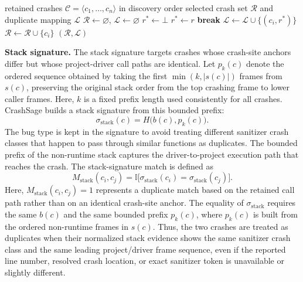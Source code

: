 \documentclass[pdflatex,sn-basic]{sn-jnl}%
\theoremstyle{thmstyleone}%
\theoremstyle{thmstyletwo}%
\theoremstyle{thmstylethree}%
\begin{document}
\begin{algorithm}[H]
\caption{Representative Selection}
\label{alg:representative-selection}
\begin{algorithmic}
\Require retained crashes \(\mathcal{C}=\langle c_1,\ldots,c_n\rangle\) in discovery order
\Ensure selected crash set \(\mathcal{R}\) and duplicate mapping \(\mathcal{L}\)
\State \(\mathcal{R}\gets\varnothing\), \(\mathcal{L}\gets\varnothing\)
    \State \(r^\ast\gets\bot\)
            \State \(r^\ast\gets r\)
            \State \textbf{break}
        \EndIf
    \EndFor
        \State \(\mathcal{L}\gets\mathcal{L}\cup\{(c_i,r^\ast)\}\)
    \Else
        \State \(\mathcal{R}\gets\mathcal{R}\cup\{c_i\}\)
    \EndIf
\EndFor
\State \Return \((\mathcal{R},\mathcal{L})\)
\end{algorithmic}
\end{algorithm}

\textbf{Stack signature.} The stack signature targets crashes whose crash-site anchors differ but whose project-driver call paths are identical.
Let \(p_k(c)\) denote the ordered sequence obtained by taking the first \(\min(k,|s(c)|)\) frames from \(s(c)\), preserving the original stack order from the top crashing frame to lower caller frames.
Here, \(k\) is a fixed prefix length used consistently for all crashes.
CrashSage builds a stack signature from this bounded prefix:
\begin{equation*}
\sigma_{\mathrm{stack}}(c)=H\bigl(b(c),p_k(c)\bigr).
\end{equation*}
The bug type is kept in the signature to avoid treating different sanitizer crash classes that happen to pass through similar functions as duplicates.
The bounded prefix of the non-runtime stack captures the driver-to-project execution path that reaches the crash.
The stack-signature match is defined as
\begin{equation*}
M_{\mathrm{stack}}(c_i,c_j)=
\mathbb{I}\bigl[
\sigma_{\mathrm{stack}}(c_i)=\sigma_{\mathrm{stack}}(c_j)
\bigr].
\end{equation*}
Here, \(M_{\mathrm{stack}}(c_i,c_j)=1\) represents a duplicate match based on the retained call path rather than on an identical crash-site anchor.
The equality of \(\sigma_{\mathrm{stack}}\) requires the same \(b(c)\) and the same bounded prefix \(p_k(c)\), where \(p_k(c)\) is built from the ordered non-runtime frames in \(s(c)\).
Thus, the two crashes are treated as duplicates when their normalized stack evidence shows the same sanitizer crash class and the same leading project/driver frame sequence, even if the reported line number, resolved crash location, or exact sanitizer token is unavailable or slightly different.
\end{document}
